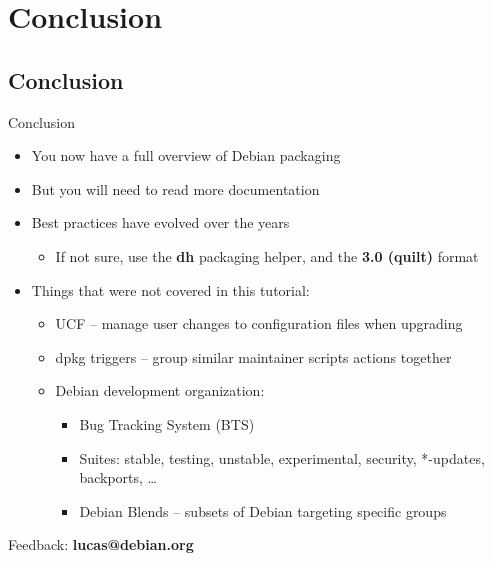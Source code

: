 \documentclass[10pt,final]{beamer}
\begin{document}
\section{Conclusion}
\subsection{Conclusion}
\begin{frame}{Conclusion}
  \begin{itemize}
  \item You now have a full overview of Debian packaging
    \br
  \item But you will need to read more documentation
    \br
  \item Best practices have evolved over the years
    \begin{itemize}
    \item If not sure, use the \textbf{dh} packaging helper, and the \textbf{3.0 (quilt)} format
    \end{itemize}
    \br
  \item Things that were not covered in this tutorial:
    \begin{itemize}
	\item UCF -- manage user changes to configuration files when upgrading
		\hbr
	\item dpkg triggers -- group similar maintainer scripts actions together
		\hbr
	\item Debian development organization:
		\begin{itemize}
			\item Bug Tracking System (BTS)
			\item Suites: stable, testing, unstable, experimental, security, *-updates, backports, \ldots
			\item Debian Blends -- subsets of Debian targeting specific groups
		\end{itemize}
		\end{itemize}
  \end{itemize}
  \vfill
  \centerline{\large Feedback: \textbf{lucas@debian.org}}
\end{frame}
\end{document}
